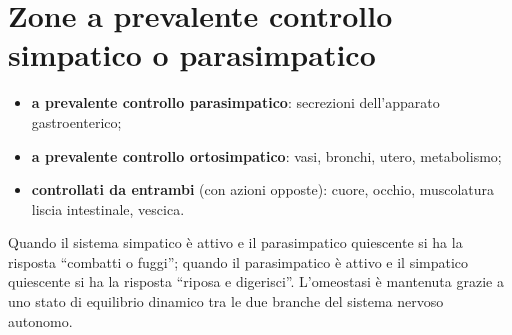\section{Zone a prevalente controllo simpatico o parasimpatico}

\begin{itemize}
  \item \textbf{a prevalente controllo parasimpatico}: secrezioni
    dell'apparato gastroenterico;
  \item \textbf{a prevalente controllo ortosimpatico}: vasi, bronchi,
    utero, metabolismo;
  \item \textbf{controllati da entrambi} (con azioni opposte): cuore,
    occhio, muscolatura liscia intestinale, vescica.
\end{itemize}

Quando il sistema simpatico è attivo e il parasimpatico quiescente si ha
la risposta ``combatti o fuggi''; quando il parasimpatico è attivo e il
simpatico quiescente si ha la risposta ``riposa e digerisci''.
L'omeostasi è mantenuta grazie a uno stato di equilibrio dinamico tra le
due branche del sistema nervoso autonomo.

